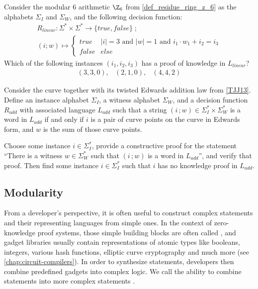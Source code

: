 \begin{exercise} Consider the modular $6$ arithmetic $\Z_6$ from \examplename{} \ref{def_residue_ring_z_6} as the alphabets $\Sigma_I$ and $\Sigma_W$, and the following decision function:
\begin{multline*}
R_{linear} : \Sigma^* \times \Sigma^* \to \{true, false\}\;;\;\\
(i;w) \mapsto
\begin{cases}
true & |i|=3 \text{ and } |w|=1 \text{ and } i_1\cdot w_1 + i_2 = i_3\\
false & else
\end{cases}
\end{multline*}
Which of the following instances $(i_1,i_2,i_3)$ has a proof of knowledge in $L_{linear}$?
$$ 
\begin{array}{ccc}
(3,3,0) , & (2,1,0), & (4,4,2)
\end{array}
$$
\end{exercise}
\begin{exercise}
\label{ex:TJJ-addition-lang} Consider the  curve together with its twisted Edwards addition law from \examplename{} \ref{TJJ13}. Define an instance alphabet $\Sigma_I$, a witness alphabet $\Sigma_W$, and a decision function $R_{add}$ with associated language $L_{add}$ such that a string $(i\,;w)\in \Sigma_I^* \times \Sigma_W^*$ is a word in $L_{add}$ if and only if $i$ is a pair of curve points on the  curve in Edwards form, and $w$ is the sum of those curve points.

Choose some instance $i\in \Sigma_I^*$, provide a constructive proof for the statement ``There is a witness $w\in \Sigma_W^*$ such that $(i\,;w)$ is a word in $L_{add}$'', and verify that proof. Then find some instance $i\in \Sigma_I^*$ such that $i$ has no knowledge proof in $L_{add}$.
\end{exercise}

\subsection{Modularity}\label{modularity} 
From a developer's perspective, it is often useful to construct complex statements and their representing languages from simple ones. In the context of zero-knowledge proof systems, those simple building blocks are often called , and gadget libraries usually contain representations of atomic types like booleans, integers, various hash functions, elliptic curve cryptography and much more (see \chaptname{} \ref{chap:circuit-compilers}). In order to synthesize statements, developers then combine predefined gadgets into complex logic. We call the ability to combine statements into more complex statements . 


